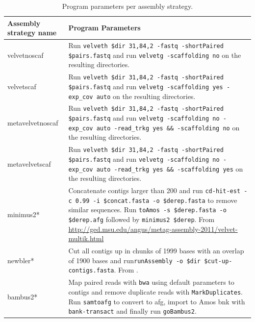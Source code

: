 \documentclass[a4paper,12pt]{article}
\begin{document}
\clearpage
\begin{landscape}
\begin{table}[h!]
\begin{tabular}{|l|p{17cm}|}
\hline
Assembly strategy name & Program Parameters\\
\hline
velvetnoscaf & Run \verb!velveth $dir 31,84,2 -fastq -shortPaired $pairs.fastq! and run \verb!velvetg -scaffolding no! on the resulting directories.\\\hline
velvetscaf & Run \verb!velveth $dir 31,84,2 -fastq -shortPaired $pairs.fastq! and run \verb!velvetg -scaffolding yes -exp_cov auto! on the resulting directories.\\\hline
metavelvetnoscaf & Run \verb!velveth $dir 31,84,2 -fastq -shortPaired $pairs.fastq! and run \verb!velvetg -scaffolding no -exp_cov auto -read_trkg yes && -scaffolding no! on the resulting directories.\\\hline
metavelvetscaf & Run \verb!velveth $dir 31,84,2 -fastq -shortPaired $pairs.fastq! and run \verb!velvetg -scaffolding no -exp_cov auto -read_trkg yes && -scaffolding yes! on the resulting directories.\\\hline
minimus2* & Concatenate contigs larger than 200 and run \newline\verb!cd-hit-est -c 0.99 -i $concat.fasta -o $derep.fasta! to remove similar sequences. Run \verb!toAmos -s $derep.fasta -o $derep.afg! followed by \verb!minimus2 $derep!. From \url{http://ged.msu.edu/angus/metag-assembly-2011/velvet-multik.html} \\\hline
newbler* & Cut all contigs up in chunks of 1999 bases with an overlap of 1900 bases and run\newline \verb!runAssembly -o $dir $cut-up-contigs.fasta!. From \cite{Luo22347999}. \\\hline
bambus2* & Map paired reads with \verb!bwa! using default parameters to contigs and remove duplicate reads with \verb!MarkDuplicates!. Run \verb!samtoafg! to convert to afg, import to Amos bnk with \verb!bank-transact! and finally run \verb!goBambus2!.\\\hline
\hline
\end{tabular}
\caption{Program parameters per assembly strategy.}
\label{tab:asmstratparameters}
\end{table}
\end{landscape}
\end{document}
